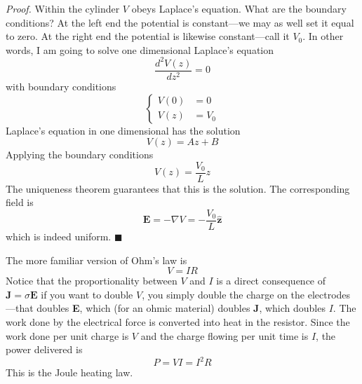 \documentclass[../../../main.tex]{subfiles}
\begin{document}
\emph{Proof.} Within the cylinder $V$ obeys Laplace's equation. What are the boundary conditions? At the left end the potential is constant—we may as well set it equal to zero. At the right end the potential is likewise constant—call it $V_0$. In other words, I am going to solve one dimensional Laplace's equation
\begin{equation*}
    \frac{d^2 V(z)}{d z^2}=0
\end{equation*}
with boundary conditions
\begin{equation*}
    \begin{cases}
        V(0) & =0   \\
        V(z) & =V_0
    \end{cases}
\end{equation*}
Laplace's equation in one dimensional has the solution
\begin{equation*}
    V(z)=Az+B
\end{equation*}
Applying the boundary conditions
\begin{equation*}
    V(z)=\frac{V_0}{L}z
\end{equation*}
The uniqueness theorem guarantees that this is the solution. The corresponding ﬁeld is
\begin{equation*}
    \mathbf{E}=-\nabla V=-\frac{V_0}{L}\mathbf{\hat{z}}
\end{equation*}
which is indeed uniform. $\blacksquare$

The more familiar version of Ohm's law is
\begin{equation*}
    V=IR
\end{equation*}
Notice that the proportionality between $V$ and $I$ is a direct consequence of $\mathbf{J}=\sigma\mathbf{E}$ if you want to double $V$, you simply double the charge on the electrodes—that doubles \textbf{E}, which (for an ohmic material) doubles \textbf{J}, which doubles $I $. The work done by the electrical force is converted into heat in the resistor. Since the work done per unit charge is $V$ and the charge ﬂowing per unit time is $I $, the power delivered is
\begin{equation*}
    P=VI=I^2R
\end{equation*}
This is the Joule heating law.
\end{document}
